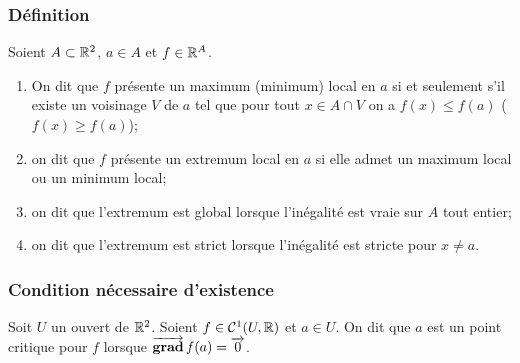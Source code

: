 \subsubsection{Définition}

\begin{defdef}
  Soient \(A \subset \mathbb{R}^2\), \(a \in A\) et \(f \in \mathbb{R}^A\).
  \begin{enumerate}
  \item On dit que \(f\) présente un maximum (minimum) local en \(a\) si et seulement s'il existe un voisinage \(V\) de \(a\) tel que pour tout \(x \in A \cap V\) on a \(f(x) \leqslant f(a)\) (\(f(x) \geqslant f(a)\));
  \item on dit que \(f\) présente un extremum local en \(a\) si elle admet un maximum local ou un minimum local;
  \item on dit que l'extremum est global lorsque l'inégalité est vraie sur \(A\) tout entier;
  \item on dit que l'extremum est strict lorsque l'inégalité est stricte pour \(x \neq a\).
  \end{enumerate}
\end{defdef}

\subsubsection{Condition nécessaire d'existence}

\begin{defdef}
  Soit \(U\) un ouvert de \(\mathbb{R}^2\). Soient \(f \in \mathcal{C}^{1}(U, \mathbb{R})\) et \(a \in U\). On dit que \(a\) est un point critique pour \(f\) lorsque \(\operatorname{\overrightarrow{\mathbf{grad}}} f(a)=\overrightarrow{0}\).
\end{defdef}

